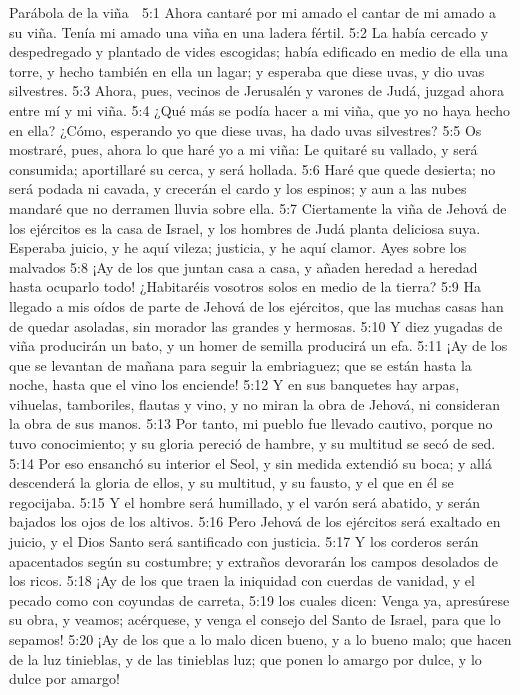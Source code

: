 Parábola de la viña  

5:1 Ahora cantaré por mi amado el cantar de mi amado a su viña. Tenía mi amado una viña en una ladera fértil.  
5:2 La había cercado y despedregado y plantado de vides escogidas; había edificado en medio de ella una torre, y hecho también en ella un lagar; y esperaba que diese uvas, y dio uvas silvestres.  
5:3 Ahora, pues, vecinos de Jerusalén y varones de Judá, juzgad ahora entre mí y mi viña.  
5:4 ¿Qué más se podía hacer a mi viña, que yo no haya hecho en ella? ¿Cómo, esperando yo que diese uvas, ha dado uvas silvestres?  
5:5 Os mostraré, pues, ahora lo que haré yo a mi viña: Le quitaré su vallado, y será consumida; aportillaré su cerca, y será hollada.  
5:6 Haré que quede desierta; no será podada ni cavada, y crecerán el cardo y los espinos; y aun a las nubes mandaré que no derramen lluvia sobre ella.  
5:7 Ciertamente la viña de Jehová de los ejércitos es la casa de Israel, y los hombres de Judá planta deliciosa suya. Esperaba juicio, y he aquí vileza; justicia, y he aquí clamor.  
Ayes sobre los malvados 
5:8 ¡Ay de los que juntan casa a casa, y añaden heredad a heredad hasta ocuparlo todo! ¿Habitaréis vosotros solos en medio de la tierra?  
5:9 Ha llegado a mis oídos de parte de Jehová de los ejércitos, que las muchas casas han de quedar asoladas, sin morador las grandes y hermosas.  
5:10 Y diez yugadas de viña producirán un bato,  y un homer de semilla producirá un efa.  
5:11 ¡Ay de los que se levantan de mañana para seguir la embriaguez; que se están hasta la noche, hasta que el vino los enciende!  
5:12 Y en sus banquetes hay arpas, vihuelas, tamboriles, flautas y vino, y no miran la obra de Jehová, ni consideran la obra de sus manos.  
5:13 Por tanto, mi pueblo fue llevado cautivo, porque no tuvo conocimiento; y su gloria pereció de hambre, y su multitud se secó de sed.  
5:14 Por eso ensanchó su interior el Seol, y sin medida extendió su boca; y allá descenderá la gloria de ellos, y su multitud, y su fausto, y el que en él se regocijaba.  
5:15 Y el hombre será humillado, y el varón será abatido, y serán bajados los ojos de los altivos.  
5:16 Pero Jehová de los ejércitos será exaltado en juicio, y el Dios Santo será santificado con justicia.  
5:17 Y los corderos serán apacentados según su costumbre; y extraños devorarán los campos desolados de los ricos.  
5:18 ¡Ay de los que traen la iniquidad con cuerdas de vanidad, y el pecado como con coyundas de carreta,  
5:19 los cuales dicen: Venga ya, apresúrese su obra, y veamos; acérquese, y venga el consejo del Santo de Israel, para que lo sepamos!  
5:20 ¡Ay de los que a lo malo dicen bueno, y a lo bueno malo; que hacen de la luz tinieblas, y de las tinieblas luz; que ponen lo amargo por dulce, y lo dulce por amargo!  

